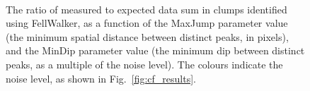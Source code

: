 \documentclass[final,authoryear,5p,times,twocolumn]{elsarticle}
\begin{document}
\begin{figure}
\hspace*{10pt}
\\
\hspace*{10pt}
\caption{The ratio of measured to expected data sum in clumps identified
using FellWalker, as a function of the MaxJump parameter value (the
minimum spatial distance between distinct peaks, in pixels), and the
MinDip parameter value (the minimum dip between distinct peaks, as a
multiple of the noise level). The colours indicate the noise level, as
shown in Fig.~\ref{fig:cf_results}.}
\label{fig:fw_results}
\end{figure}
\end{document}
